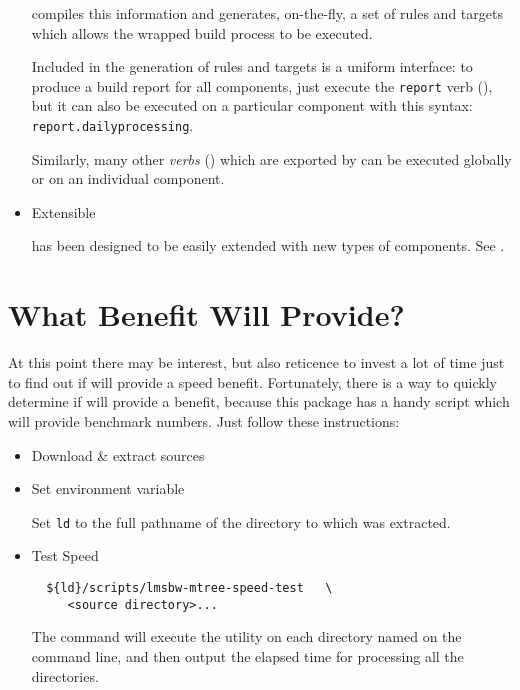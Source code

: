 \begin{itemize}
  \lmsbw compiles this information and generates, on-the-fly, a set of
  \make rules and targets which allows the wrapped build process to be
  executed.

  Included in the generation of rules and targets is a uniform
  interface: to produce a build report for all components, just
  execute the \texttt{report} verb (), but it
  can also be executed on a particular component with this syntax:
  \texttt{report.dailyprocessing}.

  Similarly, many other \emph{verbs} () which
  are exported by \lmsbw can be executed globally or on an individual
  component.

\item Extensible

  \lmsbw has been designed to be easily extended with new types of
  components.  See .
\end{itemize}

\section{What Benefit Will \lmsbw Provide?}

At this point there may be interest, but also reticence to invest a
lot of time just to find out if \lmsbw will provide a speed benefit.
Fortunately, there is a way to quickly determine if \lmsbw will
provide a benefit, because this package has a handy script which will
provide benchmark numbers.  Just follow these instructions:

\begin{itemize}
\item Download \& extract \lmsbw sources

\item Set environment variable

  Set \texttt{ld} to the full pathname of the directory to which
  \lmsbw was extracted.

\item Test Speed

\begin{verbatim}
  ${ld}/scripts/lmsbw-mtree-speed-test   \
     <source directory>...
\end{verbatim}

  The command will execute the \mtree utility on each directory named
  on the command line, and then output the elapsed time for processing
  all the directories.

\end{itemize}


